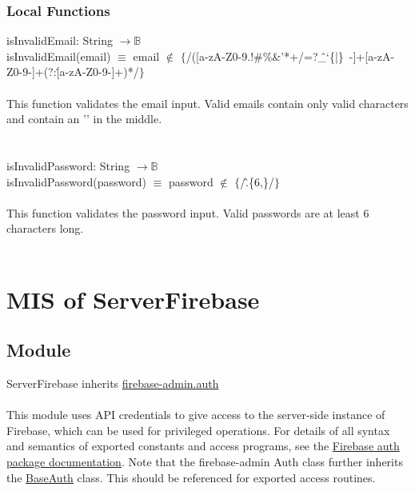 \documentclass[12pt, titlepage]{article}
\begin{document}
\subsubsection{Local Functions}
isInvalidEmail: String $\rightarrow \mathbb{B}$  \\
isInvalidEmail(email) $\equiv$ email $\notin$ $\{$/([a-zA-Z0-9.!\#\%\&'*+/=?\^\_`\{|\}~-]+\@[a-zA-Z0-9-]+(?:\.[a-zA-Z0-9-]+)*/$\}$ 
\\ \\
This function validates the email input. Valid emails contain only valid characters and contain an '\@' in the middle. \\ 
\\
\\
isInvalidPassword: String $\rightarrow \mathbb{B}$  \\
isInvalidPassword(password) $\equiv$ password $\notin$ $\{$/\^.\{6,\}/$\}$ 
\\ \\
This function validates the password input. Valid passwords are at least 6 characters long. 
\\ \\
  
\medskip
\newpage
\section{MIS of ServerFirebase} \label{ServerFirebase} 

\subsection{Module}

ServerFirebase inherits \href{https://firebase.google.com/docs/reference/admin/node/firebase-admin.auth}{firebase-admin.auth} \\ \\
This module uses API credentials to give access to the server-side instance of Firebase, which can be used for privileged operations. For details of all syntax and semantics of exported constants and access programs, see the \href{https://firebase.google.com/docs/reference/admin/node/firebase-admin.auth}{Firebase auth package documentation}. Note that the firebase-admin Auth class further inherits the \href{https://firebase.google.com/docs/reference/admin/node/firebase-admin.auth.baseauth.md#baseauth_class}{BaseAuth} class. This should be referenced for exported access routines. 
\end{document}
